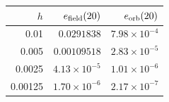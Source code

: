 \begin{tabular}{rrr}
\toprule
$h$ & $e_{\rm field}(20)$ & $e_{\rm orb}(20)$ \\
\midrule
0.01 & $0.0291838$ & $7.98\times10^{-4}$ \\
0.005 & $0.00109518$ & $2.83\times10^{-5}$ \\
0.0025 & $4.13\times10^{-5}$ & $1.01\times10^{-6}$ \\
0.00125 & $1.70\times10^{-6}$ & $2.17\times10^{-7}$ \\
\bottomrule
\end{tabular}

